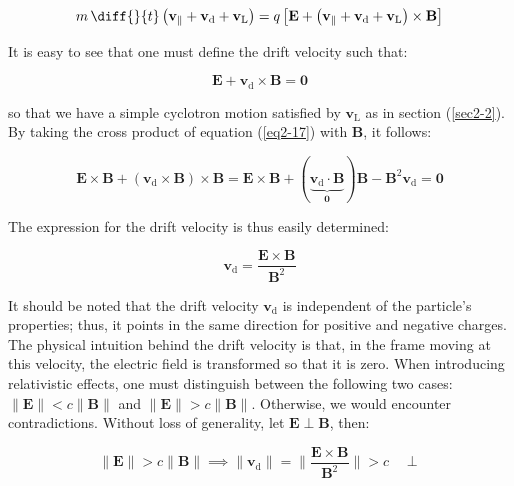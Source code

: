 \begin{equation}
    m\,\diff{}{t}\left(\mathbf{v}_\parallel+\mathbf{v}_\mathrm{d}+\mathbf{v}_\text{L}\right)=q\left[\mathbf{E}+\left(\mathbf{v}_\parallel+\mathbf{v}_\mathrm{d}+\mathbf{v}_\text{L}\right)\times\mathbf{B}\right]
\end{equation}

It is easy to see that one must define the drift velocity such that:

\begin{equation}
    \label{eq2-17}
    \mathbf{E}+\mathbf{v}_\mathrm{d}\times\mathbf{B}=\mathbf{0}
\end{equation}

so that we have a simple cyclotron motion satisfied by $\mathbf{v}_\text{L}$ as in section (\ref{sec2-2}). By taking the cross product of equation (\ref{eq2-17}) with $\mathbf{B}$, it follows:

\begin{equation}
    \mathbf{E}\times\mathbf{B}+\left(\mathbf{v}_\mathrm{d}\times\mathbf{B}\right)\times\mathbf{B}=\mathbf{E}\times\mathbf{B}+(\underbrace{\mathbf{v}_\mathrm{d}\cdot\mathbf{B}}_\mathbf{0})\mathbf{B}-\mathbf{B}^2\mathbf{v}_\mathrm{d}=\mathbf{0}
\end{equation}

The expression for the drift velocity is thus easily determined:

\begin{equation}
    \mathbf{v}_\mathrm{d}=\frac{\mathbf{E}\times\mathbf{B}}{\mathbf{B}^2}
\end{equation}

It should be noted that the drift velocity $\mathbf{v}_\mathrm{d}$ is independent of the particle's properties; thus, it points in the same direction for positive and negative charges. The physical intuition behind the drift velocity is that, in the frame moving at this velocity, the electric field is transformed so that it is zero. When introducing relativistic effects, one must distinguish between the following two cases: $\|\mathbf{E}\|<c\|\mathbf{B}\|$ and $\|\mathbf{E}\|>c\|\mathbf{B}\|$. Otherwise, we would encounter contradictions. Without loss of generality, let $\mathbf{E}\perp\mathbf{B}$, then:

\begin{equation}
    \|\mathbf{E}\|>c\|\mathbf{B}\|\implies\|\mathbf{v}_\mathrm{d}\|=\Bigg\|\frac{\mathbf{E}\times\mathbf{B}}{\mathbf{B}^2}\Bigg\|>c\quad\perp
\end{equation}

